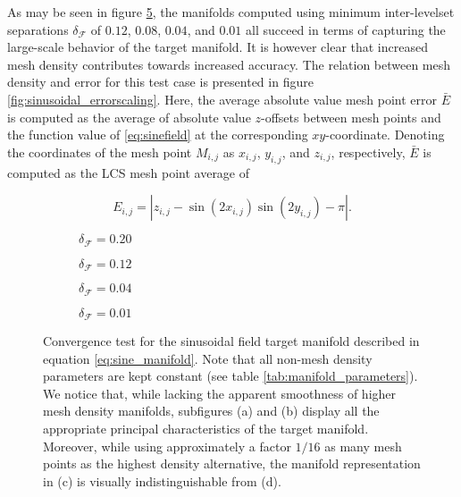 As may be seen in figure \ref{fig:sinusoidal_field}, the manifolds computed using minimum inter-levelset separations $\delta_{\mathcal{F}}$ of $0.12$, $0.08$, $0.04$, and $0.01$ all succeed in terms of capturing the large-scale behavior of the target manifold. It is however clear that increased mesh density contributes towards increased accuracy. The relation between mesh density and error for this test case is presented in figure \ref{fig:sinusoidal_errorscaling}. Here, the average absolute value mesh point error $\bar{E}$ is computed as the average of absolute value $z$-offsets between mesh points and the function value of \eqref{eq:sinefield} at the corresponding $xy$-coordinate. Denoting the coordinates of the mesh point $M_{i,j}$ as $x_{i,j}$, $y_{i,j}$, and $z_{i,j}$, respectively, $\bar{E}$ is computed as the LCS mesh point average of
 
\begin{equation}\label{eq:sine_error}
E_{i,j} = \left|z_{i,j} - \sin(2x_{i,j})\sin(2y_{i,j}) - \pi\right|.
\end{equation} 

\begin{figure}[h!]

\centering
\begin{subfigure}[b]{0.45\textwidth}
\centering

\caption{$\delta_{\mathcal{F}}=0.20$}\label{fig:sinusoidal_field_a}
\end{subfigure}
\begin{subfigure}[b]{0.45\textwidth}
\centering

\caption{$\delta_{\mathcal{F}}=0.12$}\label{fig:sinusoidal_field_b}
\end{subfigure}
\begin{subfigure}[b]{0.45\textwidth}
\centering

\caption{$\delta_{\mathcal{F}}=0.04$}\label{fig:sinusoidal_field_c}
\end{subfigure}
\begin{subfigure}[b]{0.45\textwidth}
\centering

\caption{$\delta_{\mathcal{F}}=0.01$}\label{fig:sinusoidal_field_d}
\end{subfigure}

\caption{Convergence test for the sinusoidal field target manifold described in equation \eqref{eq:sine_manifold}. Note that all non-mesh density parameters are kept constant (see table \ref{tab:manifold_parameters}). We notice that, while lacking the apparent smoothness of higher mesh density manifolds, subfigures (a) and (b) display all the appropriate principal characteristics of the target manifold. Moreover, while using approximately a factor $1/16$ as many mesh points as the highest density alternative, the manifold representation in (c) is visually indistinguishable from (d).}\label{fig:sinusoidal_field}
\end{figure}

